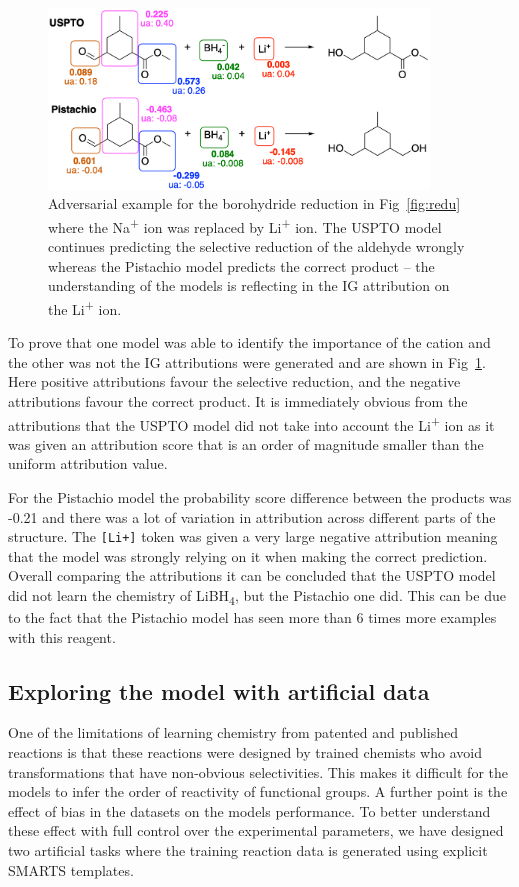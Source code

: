 \begin{figure}[htbp!] 
\centering    
\includegraphics[width=0.9\textwidth]{Chapters/Ch4/Figs/redu_adv.png}
\caption{Adversarial example for the borohydride reduction in Fig~\ref{fig:redu} where the Na\textsuperscript{+} ion was replaced by Li\textsuperscript{+} ion. The USPTO model continues predicting the selective reduction of the aldehyde wrongly whereas the Pistachio model predicts the correct product -- the understanding of the models is reflecting in the IG attribution on the Li\textsuperscript{+} ion.}
\label{fig:redu_adv}
\end{figure}

To prove that one model was able to identify the importance of the cation and the other was not the IG attributions were generated and are shown in Fig~\ref{fig:redu_adv}. Here positive attributions favour the selective reduction, and the negative attributions favour the correct product. It is immediately obvious from the attributions that the USPTO model did not take into account the Li\textsuperscript{+} ion as it was given an attribution score that is an order of magnitude smaller than the uniform attribution value.

For the Pistachio model the probability score difference between the products was -0.21 and there was a lot of variation in attribution across different parts of the structure. The \texttt{[Li+]} token was given a very large negative attribution meaning that the model was strongly relying on it when making the correct prediction. Overall comparing the attributions it can be concluded that the USPTO model did not learn the chemistry of LiBH\textsubscript{4}, but the Pistachio one did. This can be due to the fact that the Pistachio model has seen more than 6 times more examples with this reagent. 

\subsection{Exploring the model with artificial data}
\label{subsec:synth_data}
One of the limitations of learning chemistry from patented and published reactions is that these reactions were designed by trained chemists who avoid transformations that have non-obvious selectivities. This makes it difficult for the models to infer the order of reactivity of functional groups. A further point is the effect of bias in the datasets on the models performance. To better understand these effect with full control over the experimental parameters, we have designed two artificial tasks where the training reaction data is generated using explicit SMARTS templates. 

